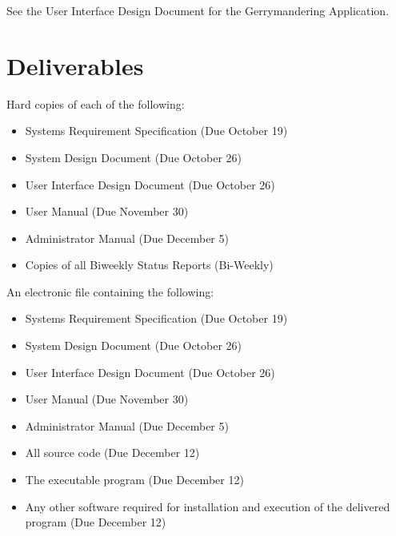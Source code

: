 \documentclass{article}
\begin{document}
See the User Interface Design Document for the Gerrymandering Application.

\vspace{2.5mm}
\section{Deliverables}\label{sec:deliverables}

Hard copies of each of the following:

\vspace{2.5mm}

\begin{adjustwidth}{2em}{0pt}
\begin{itemize}

\item Systems Requirement Specification (Due October 19)
\item System Design Document (Due October 26)
\item User Interface Design Document (Due October 26)
\item User Manual (Due November 30)
\item Administrator Manual (Due December 5)
\item Copies of all Biweekly Status Reports (Bi-Weekly)

\end{itemize}
\end{adjustwidth}

\vspace{5mm}

An electronic file containing the following: 

\vspace{2.5mm}

\begin{adjustwidth}{2em}{0pt}
\begin{itemize}

\item Systems Requirement Specification (Due October 19)
\item System Design Document (Due October 26)
\item User Interface Design Document (Due October 26)
\item User Manual (Due November 30)
\item Administrator Manual (Due December 5)
\item All source code (Due December 12)
\item The executable program (Due December 12)
\item Any other software required for installation and execution of the delivered program (Due December 12)

\end{itemize}
\end{adjustwidth}
\end{document}
